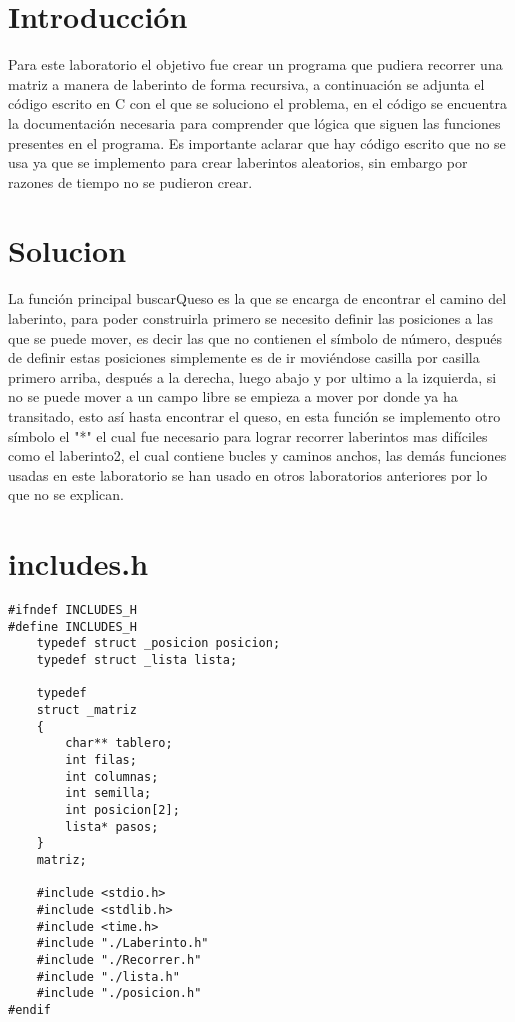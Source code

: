 \tableofcontents
\listoffigures
\newpage
\section{Introducción}
Para este laboratorio el objetivo fue crear un programa que pudiera recorrer una matriz a manera de laberinto de forma recursiva, a continuación se adjunta el código escrito en C con el que se  soluciono el problema, en el código se encuentra la documentación necesaria para comprender que lógica que siguen las funciones presentes en el programa. Es importante aclarar que hay código escrito que no se usa ya que se implemento para crear laberintos aleatorios, sin embargo por razones de tiempo no se pudieron crear.

\section{Solucion}
La función principal buscarQueso es la que se encarga de encontrar el camino del laberinto, para poder construirla primero se necesito definir las posiciones a las que se puede mover, es decir las que no contienen el símbolo de número, después de definir estas posiciones simplemente es de ir moviéndose casilla por casilla primero arriba, después a la derecha, luego abajo y por ultimo a la izquierda, si no se puede mover a un campo libre se empieza a mover por donde ya ha transitado, esto así hasta encontrar el queso, en esta función se implemento otro símbolo el "*" el cual fue necesario para lograr recorrer laberintos mas difíciles como el laberinto2, el cual contiene bucles y caminos anchos, las demás funciones usadas en este laboratorio se han usado en otros laboratorios anteriores por lo que no se explican.  

\newpage
\section{includes.h}

\begin{verbatim} 
#ifndef INCLUDES_H
#define INCLUDES_H
    typedef struct _posicion posicion;
    typedef struct _lista lista;

    typedef
    struct _matriz
    {
        char** tablero;
        int filas;
        int columnas;
        int semilla;
        int posicion[2];
        lista* pasos;
    }
    matriz;

    #include <stdio.h>
    #include <stdlib.h>
    #include <time.h>
    #include "./Laberinto.h"
    #include "./Recorrer.h"
    #include "./lista.h"
    #include "./posicion.h"
#endif
\end{verbatim}  

